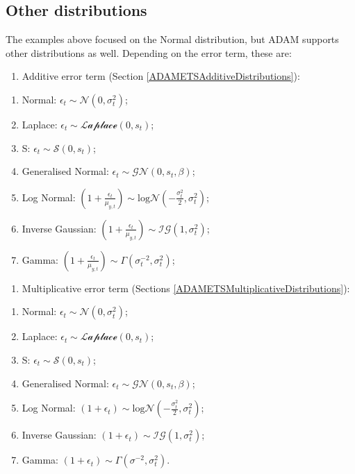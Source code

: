 \documentclass[
]{book}
\providecommand{\tightlist}{%
  \setlength{\itemsep}{0pt}\setlength{\parskip}{0pt}}
\theoremstyle{definition}
\theoremstyle{definition}
\theoremstyle{definition}
\theoremstyle{definition}
\theoremstyle{remark}
\begin{document}
\hypertarget{other-distributions}{%
\subsection{Other distributions}\label{other-distributions}}

The examples above focused on the Normal distribution, but ADAM supports other distributions as well. Depending on the error term, these are:

\begin{enumerate}
\def\labelenumi{\arabic{enumi}.}
\tightlist
\item
  Additive error term (Section \ref{ADAMETSAdditiveDistributions}):
\end{enumerate}

\begin{enumerate}
\def\labelenumi{\alph{enumi}.}
\tightlist
\item
  Normal: \(\epsilon_t \sim \mathcal{N}(0, \sigma_t^2)\);
\item
  Laplace: \(\epsilon_t \sim \mathcal{Laplace}(0, s_t)\);
\item
  S: \(\epsilon_t \sim \mathcal{S}(0, s_t)\);
\item
  Generalised Normal: \(\epsilon_t \sim \mathcal{GN}(0, s_t, \beta)\);
\item
  Log Normal: \(\left(1+\frac{\epsilon_t}{\mu_{y,t}} \right) \sim \text{log}\mathcal{N}\left(-\frac{\sigma_t^2}{2}, \sigma_t^2\right)\);
\item
  Inverse Gaussian: \(\left(1+\frac{\epsilon_t}{\mu_{y,t}} \right) \sim \mathcal{IG}(1, \sigma_t^2)\);
\item
  Gamma: \(\left(1+\frac{\epsilon_t}{\mu_{y,t}} \right) \sim \mathcal{\Gamma}(\sigma_t^{-2}, \sigma_t^2)\);
\end{enumerate}

\begin{enumerate}
\def\labelenumi{\arabic{enumi}.}
\setcounter{enumi}{1}
\tightlist
\item
  Multiplicative error term (Sections \ref{ADAMETSMultiplicativeDistributions}):
\end{enumerate}

\begin{enumerate}
\def\labelenumi{\alph{enumi}.}
\tightlist
\item
  Normal: \(\epsilon_t \sim \mathcal{N}(0, \sigma_t^2)\);
\item
  Laplace: \(\epsilon_t \sim \mathcal{Laplace}(0, s_t)\);
\item
  S: \(\epsilon_t \sim \mathcal{S}(0, s_t)\);
\item
  Generalised Normal: \(\epsilon_t \sim \mathcal{GN}(0, s_t, \beta)\);
\item
  Log Normal: \(\left(1+\epsilon_t \right) \sim \mathrm{log}\mathcal{N}\left(-\frac{\sigma_t^2}{2}, \sigma_t^2\right)\);
\item
  Inverse Gaussian: \(\left(1+\epsilon_t \right) \sim \mathcal{IG}(1, \sigma_t^2)\);
\item
  Gamma: \(\left(1+\epsilon_t \right) \sim \Gamma (\sigma^{-2}, \sigma_t^2)\).
\end{enumerate}
\end{document}
